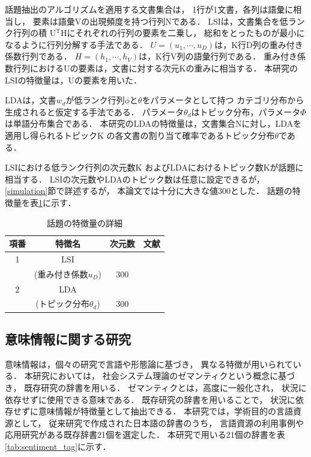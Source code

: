 \documentclass[12pt,a4paper,twocolumn,twoside]{jsik}
\begin{document}
話題抽出のアルゴリズムを適用する文書集合は，
1行が1文書，各列は語彙に相当し，
要素は語彙Vの出現頻度を持つ行列Nである．
%
LSIは，文書集合を低ランク行列の積
U$^{\mathrm{T}}$Hにそれぞれの行列の要素を二乗し，
総和をとったものが最小になるように行列分解する手法である．
%
$U = (u_{1}, \cdots , u_{D})$は，K行D列の重み付き係数行列である．
$H = (h_{1}, \cdots , h_{V})$は，K行V列の語彙行列である．
重み付き係数行列におけるUの要素は，文書に対する次元Kの重みに相当する．
本研究のLSIの特徴量は，Uの要素を用いた．

\newpage
LDAは，文書$w_{d}$が低ランク行列$\phi$と$\theta$をパラメータとして持つ
カテゴリ分布から生成されると仮定する手法である．
%
パラメータ$\theta_{d}$はトピック分布，パラメータ$\Phi$は単語分布集合である．
%
本研究のLDAの特徴量は，文書集合Nに対し，LDAを適用し得られるトピックK
の各文書の割り当て確率であるトピック分布$\theta$である．

LSIにおける低ランク行列の次元数K
およびLDAにおけるトピック数Kが話題に相当する．
%
LSIの次元数やLDAのトピック数は任意に設定できるが，
\ref{simulation}節で詳述するが，
本論文では十分に大きな値300とした．
%
話題の特徴量を表\ref{tab:topic_tag}に示す．
%
\begin{table}[htb]
  \caption{話題の特徴量の詳細}
  \label{tab:topic_tag}
  \begin{center}
  \begin{tabular}{|c|c|c|c|} \hline
    項番 & 特徴名 & 次元数 & 文献 \\ \hline \hline
    1 & LSI & & \\
     & (重み付き係数$u_{D}$) & 300 & \cite{topic_book,lsi_required} \\ \hline
    2 &LDA & & \\
     & (トピック分布$\theta_{d}$) & 300 & \cite{topic_book,lsi_required} \\ \hline
  \end{tabular}
  \end{center}
\end{table}

\subsection{意味情報に関する研究}\label{DIC}
意味情報は，個々の研究で言語や形態論に基づき，
異なる特徴が用いられている\cite{reduplicated}．
%
本研究においては，
社会システム理論のゼマンティクという概念に基づき，
既存研究の辞書を用いる\cite{Luhmann}．
%
ゼマンティクとは，高度に一般化され，
状況に依存せずに使用できる意味である．
既存研究の辞書を用いることで，
状況に依存せずに意味情報が特徴量として抽出できる．
%
本研究では，学術目的の言語資源として，
従来研究で作成された日本語の辞書のうち，
言語資源の利用事例や応用研究がある既存辞書21個を選定した．
%
本研究で用いる21個の辞書を表\ref{tab:sentiment_tag}に示す．
\end{document}
